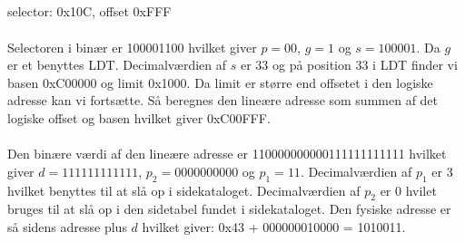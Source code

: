 \documentclass[titlepage]{article}
\begin{document}
  \subsection{}
    selector: 0x10C, offset 0xFFF
    \\\\
    Selectoren i binær er 100001100 hvilket giver $p = 00$, $g = 1$ og $s = 100001$.
    Da $g$ er et benyttes LDT.
    Decimalværdien af $s$ er 33 og på position 33 i LDT finder vi basen 0xC00000 og limit 0x1000.
    Da limit er større end offsetet i den logiske adresse kan vi fortsætte.
    Så beregnes den lineære adresse som summen af det logiske offset og basen hvilket giver 0xC00FFF.
    \\\\
    Den binære værdi af den lineære adresse er 110000000000111111111111 hvilket giver $d = 111111111111$, $p_2 = 0000000000$ og $p_1 = 11$.
    Decimalværdien af $p_1$ er 3 hvilket benyttes til at slå op i sidekataloget.
    Decimalværdien af $p_2$ er 0 hvilet bruges til at slå op i den sidetabel fundet i sidekataloget.
    Den fysiske adresse er så sidens adresse plus $d$ hvilket giver: 0x43 + 000000010000 = 1010011.
\end{document}
